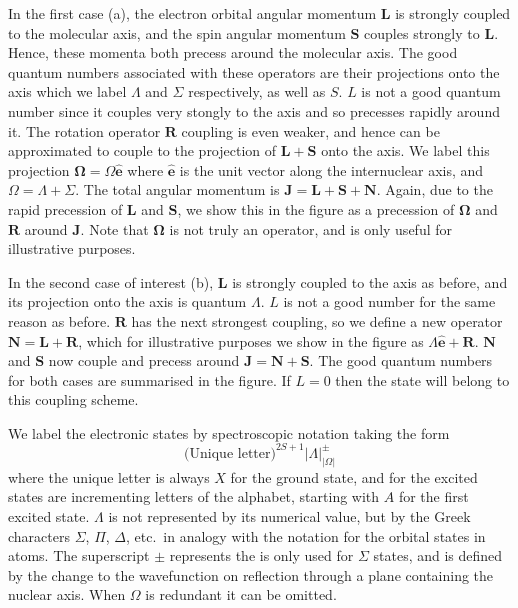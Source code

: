In the first case (a), the electron orbital angular momentum $\mathbf{L}$ is
strongly coupled to the molecular axis, and the spin angular momentum
$\mathbf{S}$ couples strongly to $\mathbf{L}$. Hence, these momenta both
precess around the molecular axis. The good quantum numbers associated with
these operators are their projections onto the axis which we label $\Lambda$
and $\Sigma$  respectively, as well as $S$. $L$ is not a good quantum number
since it couples very stongly to the axis and so precesses rapidly around it.
%
The rotation operator $\mathbf{R}$ coupling is even weaker, and hence can be
approximated to couple to the projection of $\mathbf{L} + \mathbf{S}$ onto the
axis. We label this projection $\mathbf{\Omega} = \Omega \mathbf{\hat{e}}$
where $\mathbf{\hat{e}}$ is the unit vector along the internuclear axis, and $\Omega =
\Lambda + \Sigma$. The total angular momentum is $\mathbf{J} = \mathbf{L} +
\mathbf{S} + \mathbf{N}$. Again, due to the rapid precession of $\mathbf{L}$
and $\mathbf{S}$, we show this in the figure as a precession of
$\mathbf{\Omega}$ and $\mathbf{R}$ around $\mathbf{J}$. Note that
$\mathbf{\Omega}$ is not truly an operator, and is only useful for illustrative
purposes.

In the second case of interest (b), $\mathbf{L}$ is strongly coupled to the
axis as before, and its projection onto the axis is quantum
$\Lambda$. $L$ is not a good number for the same reason as before.
$\mathbf{R}$ has the next strongest coupling, so we define a new operator
$\mathbf{N} = \mathbf{L} + \mathbf{R}$, which for illustrative purposes we show
in the figure as $\Lambda \mathbf{\hat{e}} + \mathbf{R}$.  $\mathbf{N}$ and
$\mathbf{S}$ now couple and precess around $\mathbf{J} = \mathbf{N} +
\mathbf{S}$. The good quantum numbers for both cases are summarised in the
figure. If $L=0$ then the state will belong to this coupling scheme.

We label the electronic states by spectroscopic notation taking the form
%
\begin{equation*} 
  \text{(Unique letter)}^{2S+1}|\Lambda|^\pm_{|\Omega|}
\end{equation*}
%
where the unique letter is always $X$ for the ground state, and for the excited
states are 
incrementing letters of the alphabet, starting with $A$ for the first
excited state. $\Lambda$ is not represented by its numerical value, but
by the Greek characters $\Sigma$, $\Pi$, $\Delta$, etc.\ in analogy with the
notation for the orbital states in atoms. The superscript $\pm$ represents the
is only used for $\Sigma$ states, and is defined by the change to
the wavefunction on reflection through a plane containing the nuclear axis.
When $\Omega$ is redundant it can be omitted.

